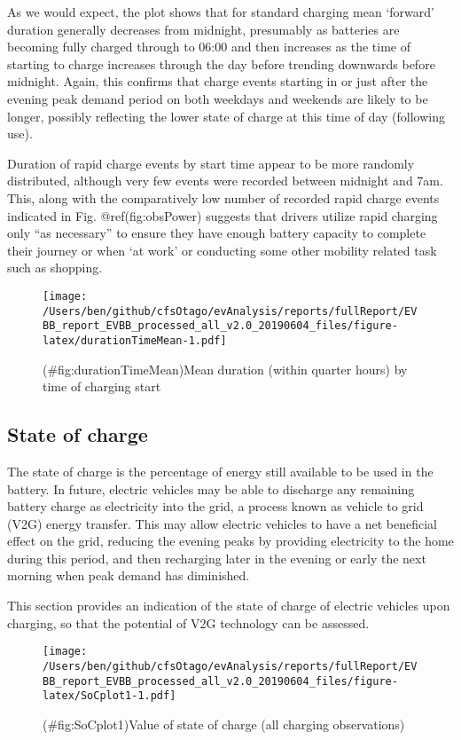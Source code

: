 \documentclass[]{article}
\begin{document}
As we would expect, the plot shows that for standard charging mean `forward' duration generally decreases from midnight, presumably as batteries are becoming fully charged through to 06:00 and then increases as the time of starting to charge increases through the day before trending downwards before midnight. Again, this confirms that charge events starting in or just after the evening peak demand period on both weekdays and weekends are likely to be longer, possibly reflecting the lower state of charge at this time of day (following use).

Duration of rapid charge events by start time appear to be more randomly distributed, although very few events were recorded between midnight and 7am. This, along with the comparatively low number of recorded rapid charge events indicated in Fig. @ref(fig:obsPower) suggests that drivers utilize rapid charging only ``as necessary'' to ensure they have enough battery capacity to complete their journey or when `at work' or conducting some other mobility related task such as shopping.

\begin{figure}
\centering
\texttt{[image: /Users/ben/github/cfsOtago/evAnalysis/reports/fullReport/EVBB\_report\_EVBB\_processed\_all\_v2.0\_20190604\_files/figure-latex/durationTimeMean-1.pdf]}
\caption{(\#fig:durationTimeMean)Mean duration (within quarter hours) by time of charging start}
\end{figure}

\hypertarget{SoC}{%
\subsection{State of charge}\label{SoC}}

The state of charge is the percentage of energy still available to be used in the battery. In future, electric vehicles may be able to discharge any remaining battery charge as electricity into the grid, a process known as vehicle to grid (V2G) energy transfer. This may allow electric vehicles to have a net beneficial effect on the grid, reducing the evening peaks by providing electricity to the home during this period, and then recharging later in the evening or early the next morning when peak demand has diminished.

This section provides an indication of the state of charge of electric vehicles upon charging, so that the potential of V2G technology can be assessed.

\begin{figure}
\centering
\texttt{[image: /Users/ben/github/cfsOtago/evAnalysis/reports/fullReport/EVBB\_report\_EVBB\_processed\_all\_v2.0\_20190604\_files/figure-latex/SoCplot1-1.pdf]}
\caption{(\#fig:SoCplot1)Value of state of charge (all charging observations)}
\end{figure}
\end{document}
